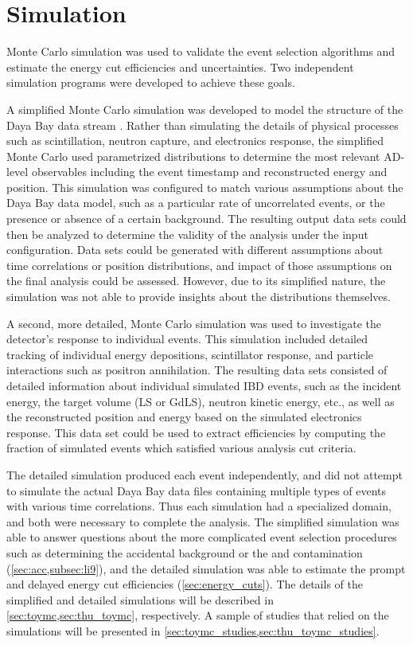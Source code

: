 \chapter{Simulation}

Monte Carlo simulation was used to validate the event selection algorithms
and estimate the energy cut efficiencies and uncertainties.
Two independent simulation programs were developed to achieve these goals.

A simplified Monte Carlo simulation was developed to model the structure
of the Daya Bay data stream \cite{dyb_toymc, dyb_toymc_docdb}.
Rather than simulating the details of physical processes such as scintillation,
neutron capture, and electronics response,
the simplified Monte Carlo used parametrized distributions
to determine the most relevant AD-level observables including the event timestamp
and reconstructed energy and position.
This simulation was configured to match various assumptions
about the Daya Bay data model,
such as a particular rate of uncorrelated events,
or the presence or absence of a certain background.
The resulting output data sets could then be analyzed
to determine the validity of the analysis
under the input configuration.
Data sets could be generated with different assumptions
about time correlations or position distributions,
and impact of those assumptions on the final analysis could be assessed.
However, due to its simplified nature,
the simulation was not able to provide insights about the distributions themselves.

A second, more detailed, Monte Carlo simulation was used
to investigate the detector's response to individual events.
This simulation included detailed tracking of individual energy depositions,
scintillator response, and particle interactions such as positron annihilation.
The resulting data sets consisted of detailed information about individual
simulated IBD events,
such as the incident \nuebar{} energy, the target volume (LS or GdLS),
neutron kinetic energy, etc.,
as well as the reconstructed position and energy
based on the simulated electronics response.
This data set could be used to extract efficiencies
by computing the fraction of simulated events which satisfied
various analysis cut criteria.

The detailed simulation produced each event independently,
and did not attempt to simulate the actual Daya Bay data files
containing multiple types of events with various time correlations.
Thus each simulation had a specialized domain,
and both were necessary to complete the analysis.
The simplified simulation was able to answer questions about the more complicated
event selection procedures such as determining the accidental background
or the \li{} and \he{} contamination (\cref{sec:acc,subsec:li9}),
and the detailed simulation was able to estimate
the prompt and delayed energy cut efficiencies (\cref{sec:energy_cuts}).
The details of the simplified and detailed simulations will be described
in \cref{sec:toymc,sec:thu_toymc}, respectively.
A sample of studies that relied on the simulations will be presented
in \cref{sec:toymc_studies,sec:thu_toymc_studies}.

